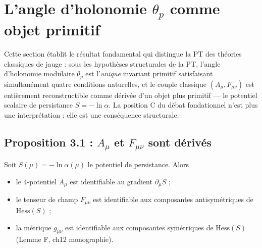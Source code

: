 \section{L'angle d'holonomie $\theta_p$ comme objet primitif}
\label{sec:holonomie_primitive}

Cette section établit le résultat fondamental qui distingue la
PT des théories classiques de jauge : sous les hypothèses
structurales de la PT, l'angle d'holonomie modulaire $\theta_p$
est l'\emph{unique} invariant primitif satisfaisant
simultanément quatre conditions naturelles, et le couple
classique $(A_\mu, F_{\mu\nu})$ est entièrement reconstructible
comme dérivée d'un objet plus primitif --- le potentiel scalaire
de persistance $S = -\ln \alpha$. La position C du débat
fondationnel n'est plus une interprétation : elle est une
conséquence structurale.

\subsection{Proposition 3.1 : $A_\mu$ et $F_{\mu\nu}$ sont dérivés}
\label{ssec:prop_3_1}

\begin{proposition}
\label{prop:A_F_derives}
Soit $S(\mu) = -\ln \alpha(\mu)$ le potentiel de persistance. Alors
\begin{itemize}
  \item le 4-potentiel $A_\mu$ est identifiable au gradient
  $\partial_\mu S$ ;
  \item le tenseur de champ $F_{\mu\nu}$ est identifiable aux
  composantes antisymétriques de $\mathrm{Hess}(S)$ ;
  \item la métrique $g_{\mu\nu}$ est identifiable aux composantes
  symétriques de $\mathrm{Hess}(S)$ (Lemme F, ch12 monographie).
\end{itemize}
\end{proposition}

